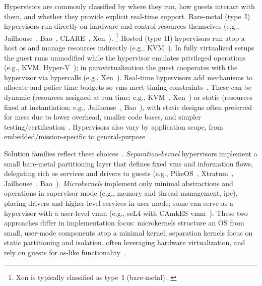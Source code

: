 Hypervisors are commonly classified by where they run, how guests interact with
them, and whether they provide explicit real-time support. Bare-metal (type~I)
hypervisors run directly on hardware and control resources themselves (e.g.,
Jailhouse~\cite{jailhouse}, Bao~\cite{martins_et_al:OASIcs:2020:11779},
CLARE~\cite{clare-home}, Xen~\cite{xen-home}).%
\footnote{Xen is typically classified as type~I (bare-metal).~\cite{cinque2022virtualizing}}
Hosted (type~II) hypervisors run atop a host \gls{os} and manage resources
indirectly (e.g., KVM~\cite{kivity2007kvm}). In fully virtualized setups the
guest runs unmodified while the hypervisor emulates privileged operations (e.g.,
KVM, Hyper-V~\cite{microsoftHyperV}); in paravirtualization the guest
cooperates with the hypervisor via hypercalls (e.g., Xen~\cite{barham2003xen}).
Real-time hypervisors add mechanisms to allocate and police time budgets so \glspl{vm}
meet timing constraints~\cite{cinque2022virtualizing}. These can be dynamic
(resources assigned at run time; e.g., KVM~\cite{kivity2007kvm}, Xen~\cite{barham2003xen})
or static (resources fixed at instantiation; e.g., Jailhouse~\cite{jailhouse}, Bao~\cite{martins_et_al:OASIcs:2020:11779}),
with static designs often preferred for \glspl{mcs} due to lower overhead, smaller
code bases, and simpler testing/certification~\cite{cinque2022virtualizing}. Hypervisors also vary by
application scope, from embedded/mission-specific to general-purpose~\cite{heiser2008role}.

Solution families reflect these choices~\cite{cinque2022virtualizing}. \emph{Separation-kernel}
hypervisors implement a small bare-metal partitioning layer that defines fixed
\glspl{vm} and information flows, delegating rich \gls{os} services and drivers to
guests (e.g., PikeOS~\cite{pikeOS}, Xtratum~\cite{masmano2009xtratum}, Jailhouse~\cite{jailhouse},
Bao~\cite{martins_et_al:OASIcs:2020:11779}). \emph{Microkernels} implement only minimal abstractions and
operations in supervisor mode (e.g., memory and thread management, \gls{ipc}), placing
drivers and higher-level services in user mode; some can serve as a hypervisor
with a user-level \gls{vmm} (e.g., seL4 with CAmkES \gls{vmm}~\cite{klein_sel4_2009,matos_sel4_2022}).
These two approaches differ in implementation focus: microkernels structure an
OS from small, user-mode components atop a minimal kernel; separation kernels
focus on static partitioning and isolation, often leveraging hardware
virtualization, and rely on guests for \gls{os}-like functionality~\cite{cinque2022virtualizing}.%

